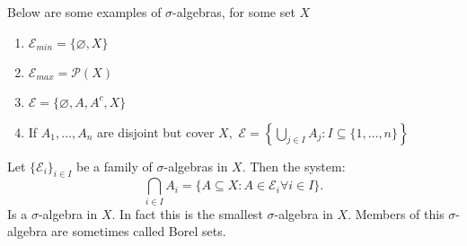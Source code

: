 \documentclass{article}
\begin{document}
\begin{exmp}
    Below are some examples of $\sigma$-algebras, for some set $X$
    \begin{enumerate}
        \item $\mathcal{E}_{min}=\{\varnothing,X\} $
        \item $\mathcal{E}_{max}=\mathcal{P}(X)$
        \item $\mathcal{E}=\{\varnothing,A,A^{c},X\} $
        \item If $A_1,\dots,A_n$ are disjoint but cover $X,$ $\mathcal{E}=\left\{\bigcup\limits_{j\in I} A_j:I\subseteq \{1,\dots,n\} \right\} $
    \end{enumerate}
\end{exmp}

\begin{thm}
    Let $\{\mathcal{E}_i\} _{i\in I}$ be a family of $\sigma$-algebras in $X$. Then the system:
    \[
    \bigcap_{i\in I} A_i=\{A\subseteq X:A\in \mathcal{E}_i\forall i\in I\} 
    .\] 
    Is a $\sigma$-algebra in $X$. In fact this is the smallest $\sigma$-algebra in $X$. Members of this $\sigma$-algebra are sometimes called Borel sets.
\end{thm} 
\end{document}
